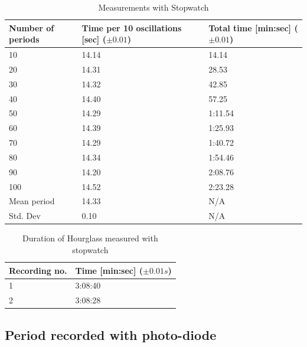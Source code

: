 \documentclass[%
 reprint,
 amsmath,amssymb,
 aps,
]{revtex4-1}
\begin{document}
    	\begin{table}[h] %
            \center
            \caption{Measurements with Stopwatch}
            \label{tab:stopwatch}
    	    \begin{tabular}{| p{1.5cm} | p{2cm} | p{2cm} |}
    		    \hline
    		    Number of periods & Time per 10 oscillations [sec] ($\pm 0.01$) & Total time [min:sec] ($\pm 0.01$)\\ \hline
    		    10 & 14.14 & 14.14 \\ \hline
    		    20 & 14.31 & 28.53 \\ \hline
    		    30 & 14.32 & 42.85 \\ \hline
    		    40 & 14.40 & 57.25 \\ \hline
    		    50 & 14.29 & 1:11.54 \\ \hline
    		    60 & 14.39 & 1:25.93 \\ \hline
    		    70 & 14.29 & 1:40.72 \\ \hline
    		    80 & 14.34 & 1:54.46 \\ \hline
    		    90 & 14.20 & 2:08.76 \\ \hline
    		    100 & 14.52 & 2:23.28 \\ \hline
                \hline
                Mean period & 14.33 & N/A \\ \hline
                Std. Dev & 0.10 & N/A \\ \hline
            \end{tabular}
        \end{table}

    	\begin{table}[h] %
            \center
            \caption{Duration of Hourglass measured with stopwatch}
            \label{tab:hourglass_stopwatch}
            \begin{tabular}{| l | l |}
                \hline
                Recording no. & Time [min:sec] ($\pm 0.01s$)\\ \hline
                1 & 3:08:40 \\ \hline
                2 & 3:08:28 \\ \hline
            \end{tabular}
    	\end{table}
        
    \subsection{Period recorded with photo-diode}
\end{document}
